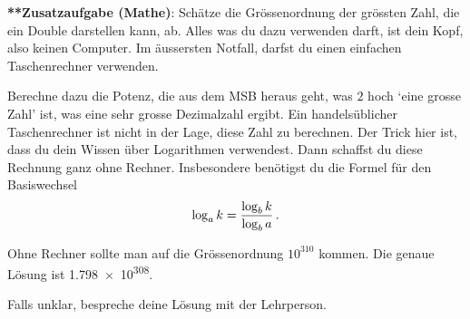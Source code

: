 \newpage

\begin{question}
	\textbf{**Zusatzaufgabe (Mathe)}: Schätze die Grössenordnung der grössten Zahl, die ein Double darstellen kann, ab. Alles was du dazu verwenden darft, ist dein Kopf, also keinen Computer. Im äussersten Notfall, darfst du einen einfachen Taschenrechner verwenden.
	
	Berechne dazu die Potenz, die aus dem MSB heraus geht, was $2$ hoch `eine grosse Zahl' ist, was eine sehr grosse Dezimalzahl ergibt. Ein handelsüblicher Taschenrechner ist nicht in der Lage, diese Zahl zu berechnen. Der Trick hier ist, dass du dein Wissen über Logarithmen verwendest. Dann schaffst du diese Rechnung ganz ohne Rechner. Insbesondere benötigst du die Formel für den Basiswechsel
	$$\log_a k = \frac{\log_b k}{\log_b a} \,.$$
\end{question}
\begin{solution}
	Ohne Rechner sollte man auf die Grössenordnung $10^{310}$ kommen. Die genaue Lösung ist \num{1.798e308}.

	Falls unklar, bespreche deine Lösung mit der Lehrperson.
\end{solution}









